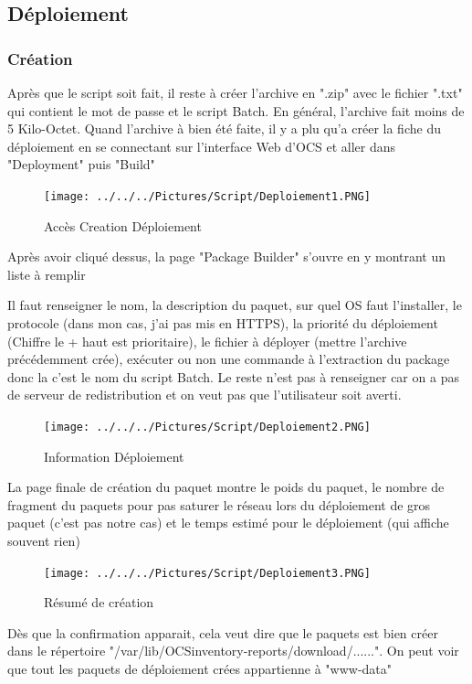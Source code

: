 \documentclass[11pt,a4paper,oneside]{article}
\begin{document}
\subsection{Déploiement}
\subsubsection{Création}
Après que le script soit fait, il reste à créer l'archive en ".zip" avec le fichier ".txt" qui contient le mot de passe et le script Batch. En général, l'archive fait moins de 5 Kilo-Octet. Quand l'archive à bien été faite, il y a plu qu'a créer la fiche du déploiement en se connectant sur l'interface Web d'OCS et aller dans "Deployment" puis "Build"
\\
\begin{figure}[hbtp]
\centering
\texttt{[image: ../../../Pictures/Script/Deploiement1.PNG]}
\caption{Accès Creation Déploiement}
\end{figure}

Après avoir cliqué dessus, la page "Package Builder" s'ouvre en y montrant un liste à remplir

Il faut renseigner le nom, la description du paquet, sur quel OS faut l'installer, le protocole (dans mon cas, j'ai pas mis en HTTPS), la priorité du déploiement (Chiffre le + haut est prioritaire), le fichier à déployer (mettre l'archive précédemment crée), exécuter ou non une commande à l'extraction du package donc la c'est le nom du script Batch. Le reste n'est pas à renseigner car on a pas de serveur de redistribution et on veut pas que l'utilisateur soit averti.
\begin{figure}[hbtp]
\centering
\texttt{[image: ../../../Pictures/Script/Deploiement2.PNG]}
\caption{Information Déploiement}
\end{figure}
\newpage

La page finale de création du paquet montre le poids du paquet, le nombre de fragment du paquets pour pas saturer le réseau lors du déploiement de gros paquet (c'est pas notre cas) et le temps estimé pour le déploiement (qui affiche souvent rien)

\begin{figure}[hbtp]
\centering
\texttt{[image: ../../../Pictures/Script/Deploiement3.PNG]}
\caption{Résumé de création}
\end{figure}

Dès que la confirmation apparait, cela veut dire que le paquets est bien créer dans le répertoire "/var/lib/OCSinventory-reports/download/......". On peut voir que tout les paquets de déploiement crées appartienne à "www-data"
\end{document}
